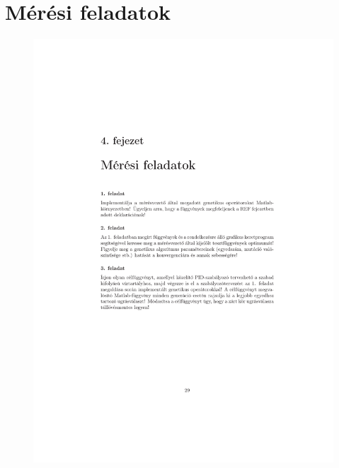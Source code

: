 \chapter{Mérési feladatok}\label{sect:LatexTools}

\begin{figure}[!ht]
	\includegraphics[trim = 40mm 60mm 40mm 100mm,clip, width=150mm,keepaspectratio]{figures/feladatok_m02.pdf}
	\label{fig:Road-of-a-char}
\end{figure}
